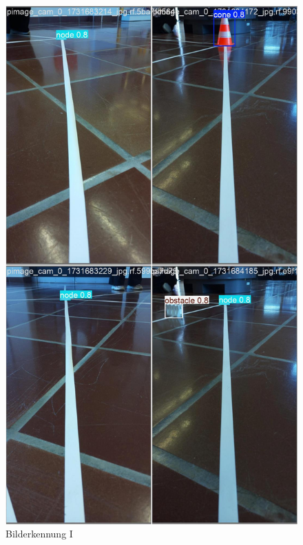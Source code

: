 \begin{figure}[H]
  \centering
    \begin{minipage}[b]{0.28\textwidth}
    \centering
    \includegraphics[width=\textwidth]{assets/IT/yolo/val_batch0_pred.jpg}
    \caption{Bilderkennung I}
    \label{fig:yolo-i}
  \end{minipage}
  \hfill
  \begin{minipage}[b]{0.28\textwidth}
    \centering

\end{minipage}
\end{figure}
